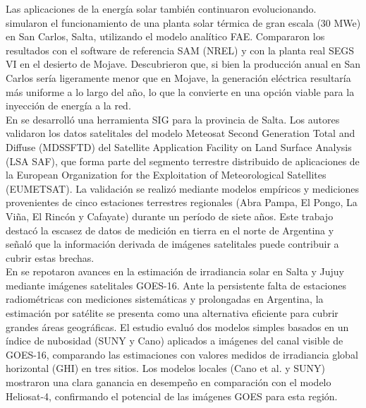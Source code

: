 Las aplicaciones de la energía solar también continuaron evolucionando. \cite{Hongn2018} simularon el funcionamiento de una planta solar térmica de gran escala (30 MWe) en San Carlos, Salta, utilizando el modelo analítico FAE. Compararon los resultados con el software de referencia SAM (NREL) y con la planta real SEGS VI en el desierto de Mojave. Descubrieron que, si bien la producción anual en San Carlos sería ligeramente menor que en Mojave, la generación eléctrica resultaría más uniforme a lo largo del año, lo que la convierte en una opción viable para la inyección de energía a la red.\\


En \cite{SarmientoBarbieri2019} se desarrolló una herramienta SIG para la provincia de Salta. Los autores validaron los datos satelitales del modelo Meteosat Second Generation Total and Diffuse (MDSSFTD) del Satellite Application Facility on Land Surface Analysis (LSA SAF), que forma parte del segmento terrestre distribuido de aplicaciones de la European Organization for the Exploitation of Meteorological Satellites (EUMETSAT). La validación se realizó mediante modelos empíricos y mediciones provenientes de cinco estaciones terrestres regionales (Abra Pampa, El Pongo, La Viña, El Rincón y Cafayate) durante un período de siete años. Este trabajo destacó la escasez de datos de medición en tierra en el norte de Argentina y señaló que la información derivada de imágenes satelitales puede contribuir a cubrir estas brechas.\\


En \cite{Ledesma2023} se repotaron avances en la estimación de irradiancia solar en Salta y Jujuy mediante imágenes satelitales GOES-16. Ante la persistente falta de estaciones radiométricas con mediciones sistemáticas y prolongadas en Argentina, la estimación por satélite se presenta como una alternativa eficiente para cubrir grandes áreas geográficas. El estudio evaluó dos modelos simples basados en un índice de nubosidad (SUNY y Cano) aplicados a imágenes del canal visible de GOES-16, comparando las estimaciones con valores medidos de irradiancia global horizontal (GHI) en tres sitios. Los modelos locales (Cano et al. y SUNY) mostraron una clara ganancia en desempeño en comparación con el modelo Heliosat-4, confirmando el potencial de las imágenes GOES para esta región.\\

